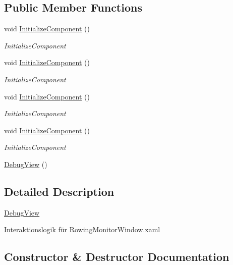 \subsection*{Public Member Functions}
\begin{DoxyCompactItemize}
\item 
void \hyperlink{class_rowing_monitor_1_1_view_1_1_debug_view_a3fd59a2688428b98569c4fc149657a70}{Initialize\+Component} ()
\begin{DoxyCompactList}\small\item\em Initialize\+Component \end{DoxyCompactList}\item 
void \hyperlink{class_rowing_monitor_1_1_view_1_1_debug_view_a3fd59a2688428b98569c4fc149657a70}{Initialize\+Component} ()
\begin{DoxyCompactList}\small\item\em Initialize\+Component \end{DoxyCompactList}\item 
void \hyperlink{class_rowing_monitor_1_1_view_1_1_debug_view_a3fd59a2688428b98569c4fc149657a70}{Initialize\+Component} ()
\begin{DoxyCompactList}\small\item\em Initialize\+Component \end{DoxyCompactList}\item 
void \hyperlink{class_rowing_monitor_1_1_view_1_1_debug_view_a3fd59a2688428b98569c4fc149657a70}{Initialize\+Component} ()
\begin{DoxyCompactList}\small\item\em Initialize\+Component \end{DoxyCompactList}\item 
\hyperlink{class_rowing_monitor_1_1_view_1_1_debug_view_a6fed59204b8250cd7d7af0a932c78394}{Debug\+View} ()
\end{DoxyCompactItemize}


\subsection{Detailed Description}
\hyperlink{class_rowing_monitor_1_1_view_1_1_debug_view}{Debug\+View} 

Interaktionslogik für Rowing\+Monitor\+Window.\+xaml 

\subsection{Constructor \& Destructor Documentation}
\mbox{\label{class_rowing_monitor_1_1_view_1_1_debug_view_a6fed59204b8250cd7d7af0a932c78394}} 
